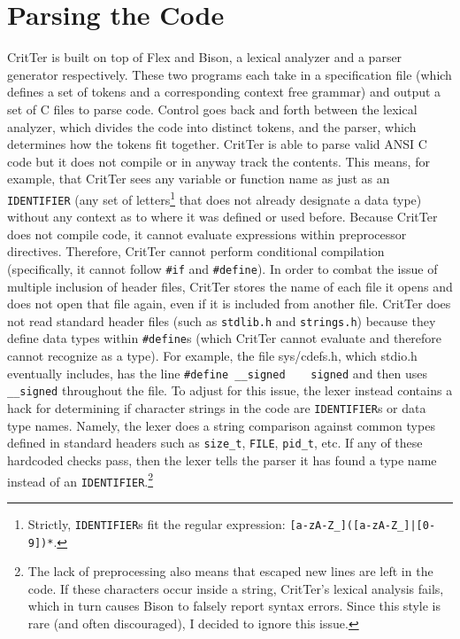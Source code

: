 \documentclass[12pt]{report}
\newcommand{\programName}{CritTer\xspace}
\begin{document}
\section{Parsing the Code}
\label{parsingTheCode}

\programName is built on top of Flex and Bison, a lexical analyzer and a  parser generator respectively. 
These two programs each take in a specification file (which defines a set of tokens and a corresponding 
context free grammar) and output a set of C files to parse code. Control goes back and forth between the 
lexical analyzer, which divides the code into distinct tokens, and the parser, which determines how the 
tokens fit together. \programName is able to parse valid ANSI C code but it does not compile or in 
anyway track the contents. This means, for example, that \programName sees any variable or function 
name as just as an \lstinline{IDENTIFIER} (any set of letters\footnote{Strictly, \lstinline{IDENTIFIER}s fit 
the regular expression: \lstinline{[a-zA-Z_]([a-zA-Z_]|[0-9])*}.} that does not already designate a data 
type) without any context as to where it was defined or used before. Because \programName does not 
compile code, it cannot evaluate expressions within preprocessor directives. Therefore, \programName 
cannot perform conditional compilation (specifically, it cannot follow \lstinline{#if} and \lstinline{#define}). 
In order to combat the issue of multiple inclusion of header files, \programName stores the name of each 
file it opens and does not open that file again, even if it is included from another file. \programName does 
not read standard header files (such as \lstinline{stdlib.h} and \lstinline{strings.h}) because they define 
data types within \lstinline{#define}s (which \programName cannot evaluate and therefore cannot 
recognize as a type). For example, the file sys/cdefs.h, which stdio.h eventually includes, has the line 
\lstinline{#define __signed    signed} and then uses \lstinline{__signed} throughout the file. To adjust for 
this issue, the lexer instead contains a hack for determining if character strings in the code are 
\lstinline{IDENTIFIER}s or data type names. Namely, the lexer does a string comparison against common 
types defined in standard headers such as \lstinline{size_t}, \lstinline{FILE}, \lstinline{pid_t}, etc. If any of 
these hardcoded checks pass, then the lexer tells the parser it has found a type name instead of an 
\lstinline{IDENTIFIER}.\footnote{The lack of preprocessing also means that escaped new lines are left in the code. If these characters occur inside a string, \programName's lexical analysis fails, which in turn causes Bison to falsely report syntax errors. Since this style is rare (and often discouraged), I decided to ignore this issue.}
\end{document}

